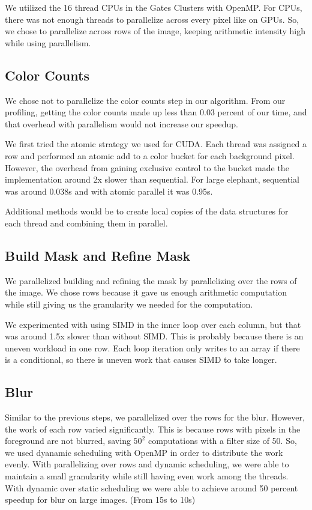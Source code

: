 \documentclass[12pt]{article}
\begin{document}
We utilized the 16 thread CPUs in the Gates Clusters with OpenMP. For CPUs, there
was not enough threads to parallelize across every pixel like on GPUs. So, we
chose to parallelize across rows of the image, keeping arithmetic intensity
high while using parallelism.

\subsection{Color Counts}

We chose not to parallelize the color counts step in our algorithm. From our
profiling, getting the color counts made up less than 0.03 percent of our time,
and that overhead with parallelism would not increase our speedup.

We first tried the atomic strategy we used for CUDA. Each thread was assigned a
row and performed an atomic add to a color bucket for each background pixel.
However, the overhead from gaining exclusive control to the bucket made the
implementation around 2x slower than sequential. For large elephant, sequential
was around 0.038s and with atomic parallel it was 0.95s.

Additional methods would be to create local copies of the data structures for
each thread and combining them in parallel.

\subsection{Build Mask and Refine Mask}

We parallelized building and refining the mask by parallelizing over the rows
of the image. We chose rows because it gave us enough arithmetic computation
while still giving us the granularity we needed for the computation.

We experimented with using SIMD in the inner loop over each column, but that
was around 1.5x slower than without SIMD. This is probably because there is an
uneven workload in one row. Each loop iteration only writes to an array if
there is a conditional, so there is uneven work that causes SIMD to take
longer.

\subsection{Blur}

Similar to the previous steps, we parallelized over the rows for the blur.
However, the work of each row varied significantly. This is because rows with
pixels in the foreground are not blurred, saving $50^2$ computations with a
filter size of 50. So, we used dyanamic scheduling with OpenMP in order to
distribute the work evenly. With parallelizing over rows and dynamic
scheduling, we were able to maintain a small granularity while still having
even work among the threads. With dynamic over static scheduling we were able
to achieve around 50 percent speedup for blur on large images. (From 15s to
10s)
\end{document}
